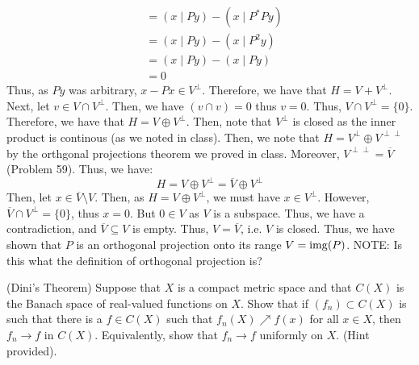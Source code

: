 \documentclass[12pt]{article}
\begin{document}
\begin{solution}
\begin{align*}
        &= (x \mid Py) - (x \mid P^*Py) \\
        &= (x \mid Py) - (x \mid P^2y) \\
        &= (x \mid Py) - (x \mid Py) \\
        &= 0
    \end{align*}
    Thus, as $Py$ was arbitrary, $x - Px \in V^\perp$. Therefore, we have that $H = V + V^\perp$. Next, let $v \in V \cap V^\perp$. Then, we have $(v \cap v) = 0$ thus $v = 0$. Thus, $V \cap V^\perp = \{0\}$. Therefore, we have that $H = V \oplus V^\perp$. \bbni
    Then, note that $V^\perp$ is closed as the inner product is continous (as we noted in class). Then, we note that $H = V^\perp \oplus V^{\perp\perp}$ by the orthgonal projections theorem we proved in class. Moreover, $V^{\perp\perp} = \overline{V}$ (Problem 59). Thus, we have:
    \[ H = V \oplus V^\perp = \overline{V} \oplus V^\perp \]
    Then, let $x \in \overline{V}\setminus V$. Then, as $H = V \oplus V^\perp$, we must have $x \in V^\perp$. However, $\overline{V} \cap V^\perp = \{0\}$, thus $x = 0$. But $0 \in V$ as $V$ is a subspace. Thus, we have a contradiction, and $\overline{V} \subseteq V$ is empty. Thus, $V = \overline{V}$, i.e. $V$ is closed. \bbni
    Thus, we have shown that $P$ is an orthogonal projection onto its range $V = \operatorname{img}(P)$. \bbni
    NOTE: Is this what the definition of orthogonal projection is?
\end{solution}
\newpage

\begin{problem}{65}(Dini's Theorem)
    Suppose that $X$ is a compact metric space and that $C(X)$ is the Banach space of real-valued functions on $X$. Show that if $(f_n) \subset C(X)$ is such that there is a $f \in C(X)$ such that $f_n(X) \nearrow f(x)$ for all $x \in X$, then $f_n \to f$ in $C(X)$. Equivalently, show that $f_n \to f$ uniformly on $X$. (Hint provided).
\end{problem}
\begin{solution}

\end{solution}
\newpage
\end{document}
